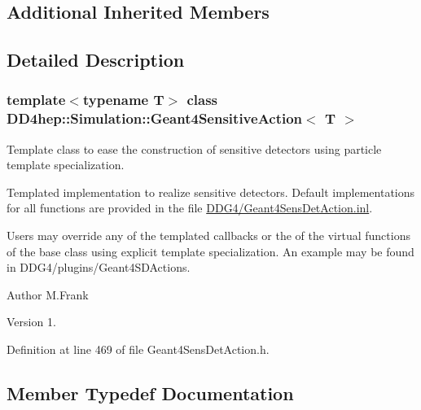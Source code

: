 \subsection*{Additional Inherited Members}


\subsection{Detailed Description}
\subsubsection*{template$<$typename T$>$\newline
class D\+D4hep\+::\+Simulation\+::\+Geant4\+Sensitive\+Action$<$ T $>$}

Template class to ease the construction of sensitive detectors using particle template specialization. 

Templated implementation to realize sensitive detectors. Default implementations for all functions are provided in the file \hyperlink{_geant4_sens_det_action_8inl}{D\+D\+G4/\+Geant4\+Sens\+Det\+Action.\+inl}.

Users may override any of the templated callbacks or the of the virtual functions of the base class using explicit template specialization. An example may be found in D\+D\+G4/plugins/\+Geant4\+S\+D\+Actions.

\begin{DoxyAuthor}{Author}
M.\+Frank 
\end{DoxyAuthor}
\begin{DoxyVersion}{Version}
1. 
\end{DoxyVersion}


Definition at line 469 of file Geant4\+Sens\+Det\+Action.\+h.



\subsection{Member Typedef Documentation}
\hypertarget{class_d_d4hep_1_1_simulation_1_1_geant4_sensitive_action_a1aa349c02363cf7471a043ad5f3b95c9}{}\label{class_d_d4hep_1_1_simulation_1_1_geant4_sensitive_action_a1aa349c02363cf7471a043ad5f3b95c9} 
